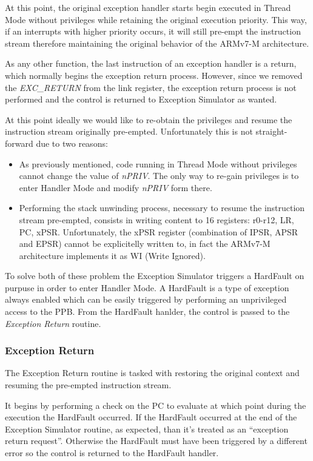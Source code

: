 \documentclass{article}
\begin{document}
At this point, the original exception handler starts begin executed in Thread Mode without privileges while retaining the original execution priority. This way, if an interrupts with higher priority occurs, it will still pre-empt the instruction stream therefore maintaining the original behavior of the ARMv7-M architecture.

As any other function, the last instruction of an exception handler is a return, which normally begins the exception return process. However, since we removed the \textit{EXC\_RETURN} from the link register, the exception return process is not performed and the control is returned to Exception Simulator as wanted.

At this point ideally we would like to re-obtain the privileges and resume the instruction stream originally pre-empted. Unfortunately this is not straight-forward due to two reasons:
\begin{itemize}
	\item As previously mentioned, code running in Thread Mode without privileges cannot change the value of \textit{nPRIV}. The only way to re-gain privileges is to enter Handler Mode and modify \textit{nPRIV} form there.
	\item Performing the stack unwinding process, necessary to resume the instruction stream pre-empted, consists in writing content to 16 registers: r0-r12, LR, PC, xPSR. Unfortunately, the xPSR register (combination of IPSR, APSR and EPSR) cannot be explicitelly written to, in fact the ARMv7-M architecture implements it as WI (Write Ignored).
\end{itemize}

To solve both of these problem the Exception Simulator triggers a HardFault on purpuse in order to enter Handler Mode. A HardFault is a type of exception always enabled which can be easily triggered by performing an unprivileged access to the PPB. From the HardFault hanlder, the control is passed to the \textit{Exception Return} routine.

\subsubsection{Exception Return}
\label{subsubsec:exc_ret}
The Exception Return routine is tasked with restoring the original context and resuming the pre-empted instruction stream.

It begins by performing a check on the PC to evaluate at which point during the execution the HardFault occurred. If the HardFault occurred at the end of the Exception Simulator routine, as expected, than it's treated as an ``exception return request''. Otherwise the HardFault must have been triggered by a different error so the control is returned to the HardFault handler.
\end{document}

